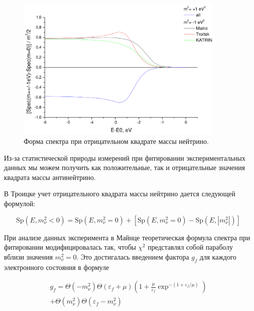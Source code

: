 ﻿\documentclass[a4paper,14pt]{extarticle}
\begin{document}
    \begin{figure}[h]
        \center
        \includegraphics[width=0.9\textwidth]{neg_mnu2.png}
        \captionsetup{width=0.8\textwidth}
        \caption{Форма спектра при отрицательном квадрате массы нейтрино.}
        \label{fig:neg_mnu2}
    \end{figure}
    
    Из-за статистической природы измерений при фитировании экспериментальных данных мы можем
    получить как положительные, так и отрицательные значения квадрата массы антинейтрино.
    
    В Троицке учет отрицательного квадрата массы нейтрино дается следующей формулой:
    
    \begin{equation}
      \text{Sp}(E, m^2_\nu<0) = \text{Sp}(E, m^2_\nu=0) + [\text{Sp}(E, m^2_\nu=0) - \text{Sp}(E, |m^2_\nu|)]
    \end{equation}
    
    При анализе данных эксперимента в Майнце\cite{kraus} теоретическая формула спектра при фитировании
    модифицировалась так, чтобы $\chi^2$ представлял собой параболу вблизи значения $m_\nu^2 = 0$.
    Это достигалась введением фактора $g_f$ для каждого электронного состояния в формуле
    
    \begin{equation}
    \begin{split}
      g_f = \Theta(-m_\nu^2)\Theta(\varepsilon_f+\mu)(1+\frac{\mu}{\varepsilon_f}\exp^{-(1+\varepsilon_f/\mu)}) \\
      +\Theta(m_\nu^2)\Theta(\varepsilon_f-m_\nu^2)
    \end{split}
    \end{equation}
    
\end{document}
